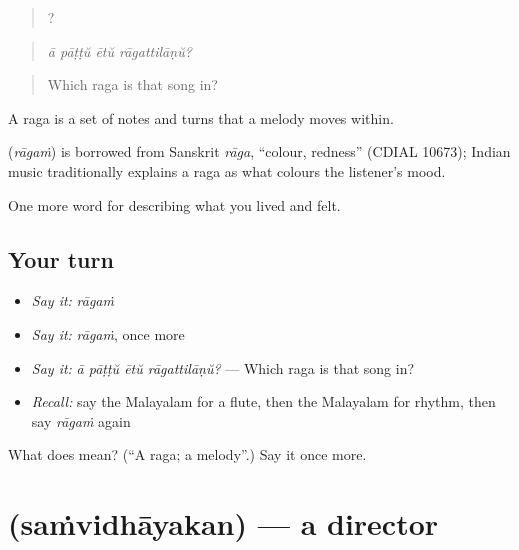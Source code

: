 \begin{quote}
   ?
\end{quote}

\begin{quote}
\emph{ā pāṭṭŭ ētŭ rāgattilāṇŭ?}
\end{quote}

\begin{quote}
Which raga is that song in?
\end{quote}

A raga is a set of notes and turns that a melody moves within.

\begin{cousinweb}
\textbf{} (\emph{rāgaṁ}) is borrowed from Sanskrit \emph{rāga}, \textquotedblleft{}colour, redness\textquotedblright{} (CDIAL 10673); Indian music traditionally explains a raga as what colours the listener's mood.
\end{cousinweb}

\begin{grammarlens}[title={What you've built}]
One more word for describing what you lived and felt.
\end{grammarlens}

\subsection*{Your turn}
\begin{itemize}
\raggedright
  \item \emph{Say it:} \emph{rāgaṁ}
  \item \emph{Say it:} \emph{rāgaṁ}, once more
  \item \emph{Say it:} \emph{ā pāṭṭŭ ētŭ rāgattilāṇŭ?} — Which raga is that song in?
  \item \emph{Recall:} say the Malayalam for a flute, then the Malayalam for rhythm, then say \emph{rāgaṁ} again
\end{itemize}

\begin{tcolorbox}[breakable,colback=teal!4,colframe=teal!35!black,title={Before you move on}]
What does  mean? (\textquotedblleft{}A raga; a melody\textquotedblright{}.) Say it once more.
\end{tcolorbox}
\section[\texorpdfstring{\ml{സംവിധായകൻ} (saṁvidhāyakan)}{സംവിധായകൻ (saṁvidhāyakan)}]{ (saṁvidhāyakan) — a director}

